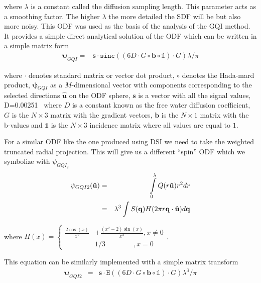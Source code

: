 \documentclass{bioinfo}
\begin{document}
\noindent \noindent where $\lambda$ is a constant called the diffusion
sampling length. This parameter acts as a smoothing factor. The higher
$\lambda$ the more detailed the SDF will be but also more noisy.
This ODF was used as the basis of the analysis of the GQI method.
It provides a simple direct analytical solution of the ODF which can
be written in a simple matrix form\begin{eqnarray}
\bm{\psi}_{GQI}= & \mathbf{s}\cdot\mathtt{sinc}((6D\cdot G\circ\mathbf{b}\circ\mathbb{1})\cdot G)\lambda/\pi\label{eq:GQI_analytical}\end{eqnarray}


\noindent where $\cdot$ denotes standard matrix or vector dot product,
\foreignlanguage{british}{$\circ$ }denotes the Hada-mard product,
$\bm{\psi}{}_{GQI}$ as a $M$-dimensional vector with components
corresponding to the selected directions $\hat{\mathbf{u}}$ on the
ODF sphere, $\mathbf{s}$ is a vector with all the signal values,
D=0.00251~\cite{canalesrodriguez2009mdq} \foreignlanguage{british}{where
$D$ is a constant known as the free water diffusion coefficient},
$G$ is the $N\times3$ matrix with the gradient vectors, $\mathbf{b}$
is the $N\times1$ matrix with the b-values and $\mathbb{1}$ is the
$N\times3$ incidence matrix where all values are equal to $1$.

For a similar ODF like the one produced using DSI we need to take
the weighted truncated radial projection. This will give us a different
{}``spin'' ODF which we symbolize with $\psi_{GQI_{2}}$\begin{eqnarray}
\psi_{GQI2}(\mathbf{\hat{u}}) & = & \intop_{0}^{\lambda}Q(r\mathbf{\hat{u}})r^{2}dr\label{eq:SDF2}\\
 & = & \lambda^{3}\int S(\mathbf{q})H(2\pi r\mathbf{q}\cdot\mathbf{\hat{u}})d\mathbf{q}\end{eqnarray}


\noindent where $H(x)=\begin{cases}
\frac{2\cos(x)}{x^{2}} & +\frac{(x^{2}-2)\sin(x)}{x^{3}},x\neq0\\
 & 1/3\qquad\qquad,x=0\end{cases}$.

\begin{flushleft}
This equation can be similarly implemented with a simple matrix transform\begin{eqnarray*}
\bm{\psi}_{GQI2} & = & \mathbf{s}\cdot\mathtt{H}((6D\cdot G\circ\mathbf{b}\circ\mathbb{1})\cdot G)\lambda^{3}/\pi\end{eqnarray*}

\par\end{flushleft}
\end{document}
